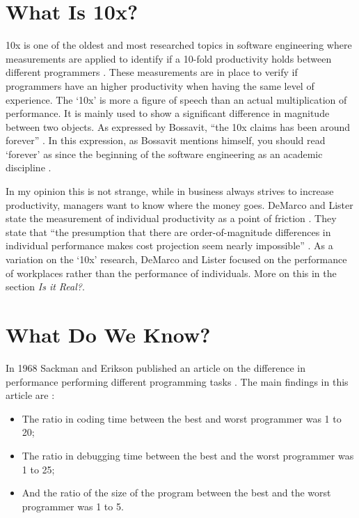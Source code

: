 \section*{What Is 10x?}

10x is one of the oldest and most researched topics in software engineering where measurements are applied to identify if a 10-fold productivity holds between different programmers \autocite[567]{MAKING_SOFTWARE}.
These measurements are in place to verify if programmers have an higher productivity when having the same level of experience.
The `10x' is more a figure of speech than an actual multiplication of performance.
It is mainly used to show a significant difference in magnitude between two objects.
As expressed by Bossavit, ``the 10x claims has been around forever'' \autocite[37]{bossavit2013leprechauns}.
In this expression, as Bossavit mentions himself, you should read `forever' as since the beginning of the software engineering as an academic discipline \autocite[38-39]{bossavit2013leprechauns}.

In my opinion this is not strange, while in business always strives to increase productivity, managers want to know where the money goes.
DeMarco and Lister state the measurement of individual productivity as a point of friction \autocite[268]{demarco1985programmer}.
They state that ``the presumption that there are order-of-magnitude differences in individual performance makes cost projection seem nearly impossible'' \autocite[268]{demarco1985programmer}.
As a variation on the `10x' research, DeMarco and Lister focused on the performance of workplaces rather than the performance of individuals.
More on this in the section \textit{Is it Real?}.

\section*{What Do We Know?}

In 1968 Sackman and Erikson published an article on the difference in performance performing different programming tasks \autocite{sackman1968exploratory}.
The main findings in this article are \autocite{sackman1968exploratory} \autocite[567]{MAKING_SOFTWARE}:
\begin{itemize}[noitemsep]
\item The ratio in coding time between the best and worst programmer was 1 to 20;
\item The ratio in debugging time between the best and the worst programmer was 1 to 25;
\item And the ratio of the size of the program between the best and the worst programmer was 1 to 5.
\end{itemize}

